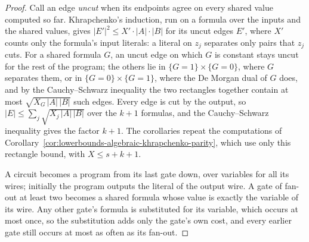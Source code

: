 \begin{proof}
  \leanok
  Call an edge \emph{uncut} when its endpoints agree on every shared value
  computed so far. Khrapchenko's induction, run on a formula over the inputs
  and the shared values, gives $|E'|^2 \le X' \cdot |A| \cdot |B|$ for its
  uncut edges $E'$, where $X'$ counts only the formula's input literals: a
  literal on $z_j$ separates only pairs that $z_j$ cuts. For a shared formula
  $G$, an uncut edge on which $G$ is constant stays uncut for the rest of the
  program; the others lie in $\{G = 1\} \times \{G = 0\}$, where $G$ separates
  them, or in $\{G = 0\} \times \{G = 1\}$, where the De Morgan dual of $G$
  does, and by the Cauchy--Schwarz inequality the two rectangles together
  contain at most $\sqrt{X_G \, |A| \, |B|}$ such edges. Every edge is cut by
  the output, so $|E| \le \sum_j \sqrt{X_j \, |A| \, |B|}$ over the $k + 1$
  formulas, and the Cauchy--Schwarz inequality gives the factor $k + 1$. The
  corollaries repeat the computations of
  Corollary~\ref{cor:lowerbounds-algebraic-khrapchenko-parity}, which use only
  this rectangle bound, with $X \le s + k + 1$.

  A circuit becomes a program from its last gate down, over variables for all
  its wires; initially the program outputs the literal of the output wire. A
  gate of fan-out at least two becomes a shared formula whose value is exactly
  the variable of its wire. Any other gate's formula is substituted for its
  variable, which occurs at most once, so the substitution adds only the gate's
  own cost, and every earlier gate still occurs at most as often as its
  fan-out.
\end{proof}

